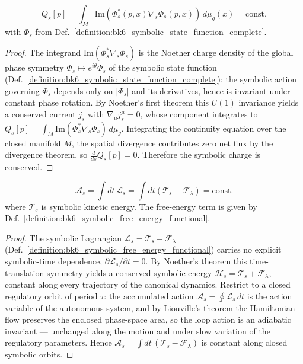 \begin{proposition}
\label{proposition:bk6_symbolic_charge_conservation}
\begin{equation}
Q_s[p] = \int_M \text{Im}(\Phi_s^*(p,x) \nabla_s \Phi_s(p,x)) \, d\mu_g(x) = \text{const.}
\end{equation}
with \(\Phi_s\) from Def.~\ref{definition:bk6_symbolic_state_function_complete}.
\end{proposition}
\begin{proof}
\label{proof:bk6_symbolic_charge_conservation}
\leavevmode
The integrand $\mathrm{Im}(\Phi_s^*\nabla_s\Phi_s)$ is the Noether charge density of the global phase symmetry $\Phi_s\mapsto e^{i\theta}\Phi_s$ of the symbolic state function (Def.~\ref{definition:bk6_symbolic_state_function_complete}): the symbolic action governing $\Phi_s$ depends only on $|\Phi_s|$ and its derivatives, hence is invariant under constant phase rotation. By Noether's first theorem this $U(1)$ invariance yields a conserved current $j_s$ with $\nabla_\mu j_s^\mu=0$, whose component integrates to $Q_s[p]=\int_M\mathrm{Im}(\Phi_s^*\nabla_s\Phi_s)\,d\mu_g$. Integrating the continuity equation over the closed manifold $M$, the spatial divergence contributes zero net flux by the divergence theorem, so $\tfrac{d}{ds}Q_s[p]=0$. Therefore the symbolic charge is conserved.
\end{proof}

\begin{proposition}
\label{proposition:bk6_total_symbolic_action_conservation}
\begin{equation}
\mathcal{A}_s = \int dt \, \mathcal{L}_s = \int dt \left( \mathcal{T}_s - \mathcal{F}_\lambda \right) = \text{const.}
\end{equation}
where $\mathcal{T}_s$ is symbolic kinetic energy.
The free-energy term is given by Def.~\ref{definition:bk6_symbolic_free_energy_functional}.
\end{proposition}
\begin{proof}
\label{proof:bk6_total_symbolic_action_conservation}
\leavevmode
The symbolic Lagrangian $\mathcal{L}_s=\mathcal{T}_s-\mathcal{F}_\lambda$ (Def.~\ref{definition:bk6_symbolic_free_energy_functional}) carries no explicit symbolic-time dependence, $\partial\mathcal{L}_s/\partial t=0$. By Noether's theorem this time-translation symmetry yields a conserved symbolic energy $\mathcal{H}_s=\mathcal{T}_s+\mathcal{F}_\lambda$, constant along every trajectory of the canonical dynamics. Restrict to a closed regulatory orbit of period $\tau$: the accumulated action $\mathcal{A}_s=\oint\mathcal{L}_s\,dt$ is the action variable of the autonomous system, and by Liouville's theorem the Hamiltonian flow preserves the enclosed phase-space area, so the loop action is an adiabatic invariant --- unchanged along the motion and under slow variation of the regulatory parameters. Hence $\mathcal{A}_s=\int dt\,(\mathcal{T}_s-\mathcal{F}_\lambda)$ is constant along closed symbolic orbits.
\end{proof}

